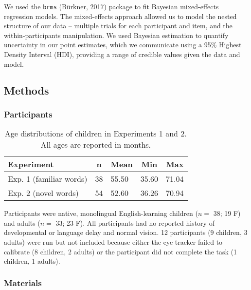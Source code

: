 \documentclass[10pt, letterpaper]{article}
\begin{document}
We used the \texttt{brms} (Bürkner, 2017) package to fit Bayesian
mixed-effects regression models. The mixed-effects approach allowed us
to model the nested structure of our data -- multiple trials for each
participant and item, and the within-participants manipulation. We used
Bayesian estimation to quantify uncertainty in our point estimates,
which we communicate using a 95\% Highest Density Interval (HDI),
providing a range of credible values given the data and model.

\hypertarget{methods}{%
\subsection{Methods}\label{methods}}

\hypertarget{participants}{%
\subsubsection{Participants}\label{participants}}

\begin{table}[tbp]
\begin{center}
\begin{threeparttable}
\caption{\label{tab:make-ss-table}Age distributions of children in Experiments 1 and 2. All ages are reported in months.}
\begin{tabular}{lllll}
\toprule
Experiment & \multicolumn{1}{c}{n} & \multicolumn{1}{c}{Mean} & \multicolumn{1}{c}{Min} & \multicolumn{1}{c}{Max}\\
\midrule
Exp. 1 (familiar words) & 38 & 55.50 & 35.60 & 71.04\\
Exp. 2 (novel words) & 54 & 52.60 & 36.26 & 70.94\\
\bottomrule
\end{tabular}
\end{threeparttable}
\end{center}
\end{table}

Participants were native, monolingual English-learning children (\(n=\)
38; 19 F) and adults (\(n=\) 33; 23 F). All participants had no reported
history of developmental or language delay and normal vision. 12
participants (9 children, 3 adults) were run but not included because
either the eye tracker failed to calibrate (8 children, 2 adults) or the
participant did not complete the task (1 children, 1 adults).

\hypertarget{materials}{%
\subsubsection{Materials}\label{materials}}
\end{document}
